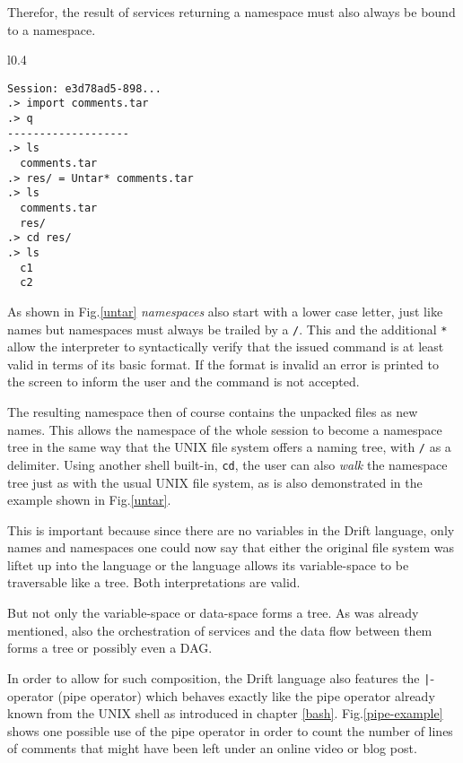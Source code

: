 Therefor, the result of services returning a namespace must
also always be bound to a namespace.

\begin{wrapfigure}{l}{0.4\textwidth}
  \begin{lstlisting}
Session: e3d78ad5-898...
.> import comments.tar
.> q
-------------------
.> ls
  comments.tar
.> res/ = Untar* comments.tar
.> ls
  comments.tar
  res/
.> cd res/
.> ls
  c1
  c2
  \end{lstlisting}
  \caption{Example of a name space binding.}
  \label{untar}
\end{wrapfigure}

As shown in Fig.\ref{untar} \textit{namespaces} also start with
a lower case letter, just like names but namespaces must always
be trailed by a \texttt{/}. This and the additional \texttt{*}
allow the interpreter to syntactically verify that the issued
command is at least valid in terms of its basic format.
If the format is invalid an error is printed to the screen to
inform the user and the command is not accepted.

The resulting namespace then of course contains the unpacked
files as new names. This allows the namespace of the whole session
to become a namespace tree in the same way that the UNIX file system
offers a naming tree, with \texttt{/} as a delimiter. Using another
shell built-in, \texttt{cd}, the user can also \textit{walk} the
namespace tree just as with the usual UNIX file system, as is
also demonstrated in the example shown in Fig.\ref{untar}.

This is important because since there are no variables in the
Drift language, only names and namespaces one could now say
that either the original file system was liftet up into the
language or the language allows its variable-space to be
traversable like a tree. Both interpretations are valid.

But not only the variable-space or data-space forms a tree. As
was already mentioned, also the orchestration of services and
the data flow between them forms a tree or possibly even a DAG.

In order to allow for such composition, the Drift language also
features the \texttt{|}-operator (pipe operator) which behaves
exactly like the pipe operator already known from the UNIX shell
as introduced in chapter \ref{bash}. Fig.\ref{pipe-example}
shows one possible use of the pipe operator in order to
count the number of lines of comments that might have been
left under an online video or blog post.

